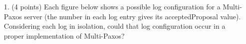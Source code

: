 \begin{enumerate}
\item[1.] (4 points)
Each figure below shows a possible log configuration for a Multi-Paxos
server (the number in each log entry gives its acceptedProposal value).
Considering each log in isolation, could that log configuration occur in
a proper implementation of Multi-Paxos?

\vspace{3ex}


\end{enumerate}
